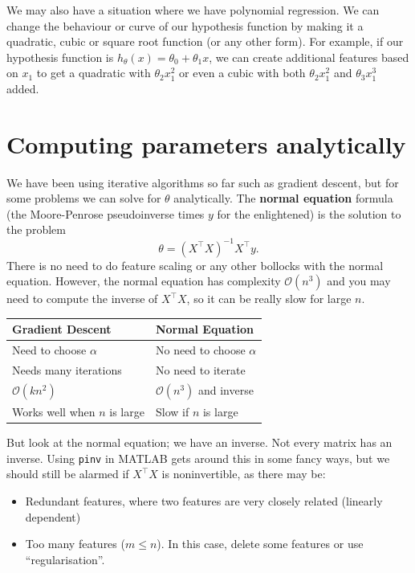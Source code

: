 \documentclass[a4paper, 10pt, oneside]{book}
\begin{document}
We may also have a situation where we have polynomial regression. We can change the behaviour or curve of our hypothesis function by making it a quadratic, cubic or square root function (or any other form). For example, if our hypothesis function is $h_\theta(x) = \theta_0 + \theta_1 x$, we can create additional features based on $x_1$ to get a quadratic with $\theta_2 x_1^2$ or even a cubic with both $\theta_2 x_1^2$ and $\theta_3 x_1^3$ added.

\section{Computing parameters analytically}

We have been using iterative algorithms so far such as gradient descent, but for some problems we can solve for $\theta$ analytically. The \textbf{normal equation} formula (the Moore-Penrose pseudoinverse times $y$ for the enlightened) is the solution to the problem
\[\theta = (X^\top X)^{-1} X^\top y.\]
There is no need to do feature scaling or any other bollocks with the normal equation. However, the normal equation has complexity $\mathcal O(n^3)$ and you may need to compute the inverse of $X^\top X$, so it can be really slow for large $n$.

\begin{center}
\begin{tabular}{l|l}
Gradient Descent & Normal Equation \\
\hline
Need to choose $\alpha$ & No need to choose $\alpha$ \\
Needs many iterations & No need to iterate \\
$\mathcal O(kn^2)$ & $\mathcal O(n^3)$ and inverse \\
Works well when $n$ is large & Slow if $n$ is large
\end{tabular}
\end{center}

But look at the normal equation; we have an inverse. Not every matrix has an inverse. Using \texttt{pinv} in MATLAB gets around this in some fancy ways, but we should still be alarmed if $X^\top X$ is noninvertible, as there may be:
\begin{itemize}
    \item Redundant features, where two features are very closely related (linearly dependent)
    \item Too many features ($m \leq n$). In this case, delete some features or use ``regularisation''.
\end{itemize}
\end{document}
